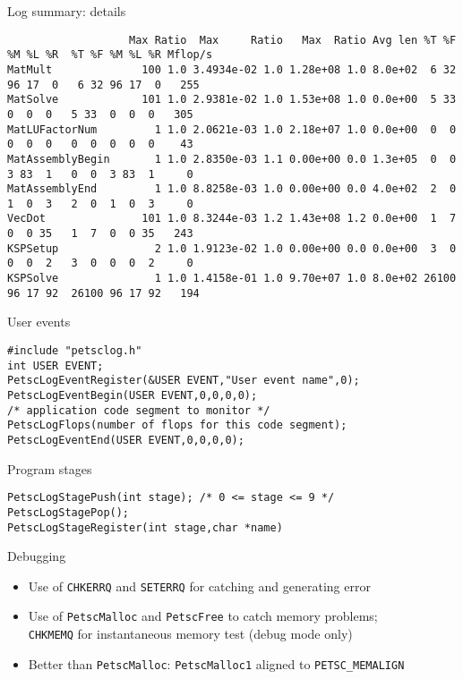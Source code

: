 \begin{numberedframe}{Log summary: details}
\tiny
\begin{verbatim}
                   Max Ratio  Max     Ratio   Max  Ratio Avg len %T %F %M %L %R  %T %F %M %L %R Mflop/s
MatMult              100 1.0 3.4934e-02 1.0 1.28e+08 1.0 8.0e+02  6 32 96 17  0   6 32 96 17  0   255
MatSolve             101 1.0 2.9381e-02 1.0 1.53e+08 1.0 0.0e+00  5 33  0  0  0   5 33  0  0  0   305
MatLUFactorNum         1 1.0 2.0621e-03 1.0 2.18e+07 1.0 0.0e+00  0  0  0  0  0   0  0  0  0  0    43
MatAssemblyBegin       1 1.0 2.8350e-03 1.1 0.00e+00 0.0 1.3e+05  0  0  3 83  1   0  0  3 83  1     0
MatAssemblyEnd         1 1.0 8.8258e-03 1.0 0.00e+00 0.0 4.0e+02  2  0  1  0  3   2  0  1  0  3     0
VecDot               101 1.0 8.3244e-03 1.2 1.43e+08 1.2 0.0e+00  1  7  0  0 35   1  7  0  0 35   243
KSPSetup               2 1.0 1.9123e-02 1.0 0.00e+00 0.0 0.0e+00  3  0  0  0  2   3  0  0  0  2     0
KSPSolve               1 1.0 1.4158e-01 1.0 9.70e+07 1.0 8.0e+02 26100 96 17 92  26100 96 17 92   194
\end{verbatim}
\end{numberedframe}

\begin{numberedframe}{User events}
\begin{lstlisting}
#include "petsclog.h"
int USER EVENT;
PetscLogEventRegister(&USER EVENT,"User event name",0);
PetscLogEventBegin(USER EVENT,0,0,0,0);
/* application code segment to monitor */
PetscLogFlops(number of flops for this code segment);
PetscLogEventEnd(USER EVENT,0,0,0,0);
\end{lstlisting}
\end{numberedframe}

\begin{numberedframe}{Program stages}
\begin{lstlisting}
PetscLogStagePush(int stage); /* 0 <= stage <= 9 */
PetscLogStagePop();
PetscLogStageRegister(int stage,char *name)
\end{lstlisting}
\end{numberedframe}

\begin{numberedframe}{Debugging}
  \begin{itemize}
  \item Use of \lstinline{CHKERRQ} and \lstinline{SETERRQ} for catching and generating
    error
  \item Use of \lstinline{PetscMalloc} and \lstinline{PetscFree} to catch memory problems;\\
    \lstinline{CHKMEMQ} for instantaneous memory test (debug mode only)
  \item Better than \lstinline{PetscMalloc}:
    \lstinline{PetscMalloc1} aligned to \lstinline{PETSC_MEMALIGN}
  \end{itemize}
\end{numberedframe}




